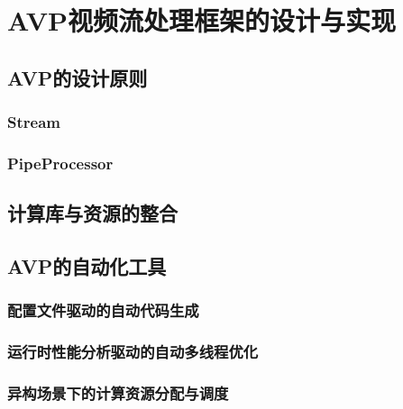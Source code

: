 
\chapter{AVP视频流处理框架的设计与实现}

\section{AVP的设计原则}

\subsection{Stream}

\subsection{PipeProcessor}


\section{计算库与资源的整合}

\section{AVP的自动化工具}

\subsection{配置文件驱动的自动代码生成}

\subsection{运行时性能分析驱动的自动多线程优化}

\subsection{异构场景下的计算资源分配与调度}

